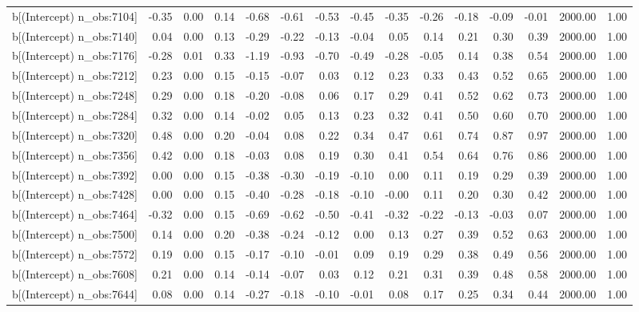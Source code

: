 \begin{table}[ht]
\begin{tabular}{rrrrrrrrrrrrrrr}
  b[(Intercept) n\_obs:7104] & -0.35 & 0.00 & 0.14 & -0.68 & -0.61 & -0.53 & -0.45 & -0.35 & -0.26 & -0.18 & -0.09 & -0.01 & 2000.00 & 1.00 \\ 
  b[(Intercept) n\_obs:7140] & 0.04 & 0.00 & 0.13 & -0.29 & -0.22 & -0.13 & -0.04 & 0.05 & 0.14 & 0.21 & 0.30 & 0.39 & 2000.00 & 1.00 \\ 
  b[(Intercept) n\_obs:7176] & -0.28 & 0.01 & 0.33 & -1.19 & -0.93 & -0.70 & -0.49 & -0.28 & -0.05 & 0.14 & 0.38 & 0.54 & 2000.00 & 1.00 \\ 
  b[(Intercept) n\_obs:7212] & 0.23 & 0.00 & 0.15 & -0.15 & -0.07 & 0.03 & 0.12 & 0.23 & 0.33 & 0.43 & 0.52 & 0.65 & 2000.00 & 1.00 \\ 
  b[(Intercept) n\_obs:7248] & 0.29 & 0.00 & 0.18 & -0.20 & -0.08 & 0.06 & 0.17 & 0.29 & 0.41 & 0.52 & 0.62 & 0.73 & 2000.00 & 1.00 \\ 
  b[(Intercept) n\_obs:7284] & 0.32 & 0.00 & 0.14 & -0.02 & 0.05 & 0.13 & 0.23 & 0.32 & 0.41 & 0.50 & 0.60 & 0.70 & 2000.00 & 1.00 \\ 
  b[(Intercept) n\_obs:7320] & 0.48 & 0.00 & 0.20 & -0.04 & 0.08 & 0.22 & 0.34 & 0.47 & 0.61 & 0.74 & 0.87 & 0.97 & 2000.00 & 1.00 \\ 
  b[(Intercept) n\_obs:7356] & 0.42 & 0.00 & 0.18 & -0.03 & 0.08 & 0.19 & 0.30 & 0.41 & 0.54 & 0.64 & 0.76 & 0.86 & 2000.00 & 1.00 \\ 
  b[(Intercept) n\_obs:7392] & 0.00 & 0.00 & 0.15 & -0.38 & -0.30 & -0.19 & -0.10 & 0.00 & 0.11 & 0.19 & 0.29 & 0.39 & 2000.00 & 1.00 \\ 
  b[(Intercept) n\_obs:7428] & 0.00 & 0.00 & 0.15 & -0.40 & -0.28 & -0.18 & -0.10 & -0.00 & 0.11 & 0.20 & 0.30 & 0.42 & 2000.00 & 1.00 \\ 
  b[(Intercept) n\_obs:7464] & -0.32 & 0.00 & 0.15 & -0.69 & -0.62 & -0.50 & -0.41 & -0.32 & -0.22 & -0.13 & -0.03 & 0.07 & 2000.00 & 1.00 \\ 
  b[(Intercept) n\_obs:7500] & 0.14 & 0.00 & 0.20 & -0.38 & -0.24 & -0.12 & 0.00 & 0.13 & 0.27 & 0.39 & 0.52 & 0.63 & 2000.00 & 1.00 \\ 
  b[(Intercept) n\_obs:7572] & 0.19 & 0.00 & 0.15 & -0.17 & -0.10 & -0.01 & 0.09 & 0.19 & 0.29 & 0.38 & 0.49 & 0.56 & 2000.00 & 1.00 \\ 
  b[(Intercept) n\_obs:7608] & 0.21 & 0.00 & 0.14 & -0.14 & -0.07 & 0.03 & 0.12 & 0.21 & 0.31 & 0.39 & 0.48 & 0.58 & 2000.00 & 1.00 \\ 
  b[(Intercept) n\_obs:7644] & 0.08 & 0.00 & 0.14 & -0.27 & -0.18 & -0.10 & -0.01 & 0.08 & 0.17 & 0.25 & 0.34 & 0.44 & 2000.00 & 1.00 \\ 

\end{tabular}
\end{table}
